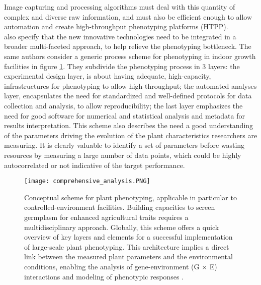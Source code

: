 Image capturing and processing algorithms must deal with this quantity of complex and diverse raw information, and must also be efficient enough to allow automation and create high-throughput phenotyping platforms (HTPP).\\
\textcite{fiorani_future_2013} also specify that the new innovative technologies need to be integrated in a broader multi-faceted approach, to help relieve the phenotyping bottleneck. The same authors consider a generic process scheme for phenotyping in indoor growth facilities in figure \ref{fig:comprehensive_analysis}. They subdivide the phenotyping process in 3 layers: the experimental design layer, is about having adequate, high-capacity, infrastructures for phenotyping to allow high-throughput; the automated analyses layer, encapsulates the need for standardized and well-defined protocols for data collection and analysis, to allow reproducibility; the last layer emphasizes the need for good software for numerical and statistical analysis and metadata for results interpretation. This scheme also describes the need a good understanding of the parameters driving the evolution of the plant characteristics researchers are measuring. It is clearly valuable to identify a set of parameters before wasting resources by measuring a large number of data points, which could be highly autocorrelated or not indicative of the target performance. 

\begin{figure}[hbtp]
    \centering
    \texttt{[image: comprehensive\_analysis.PNG]}
    \caption[Conceptual scheme for plant phenotyping]{Conceptual scheme for plant phenotyping, applicable in particular to controlled-environment facilities.
Building capacities to screen germplasm for enhanced agricultural traits requires a multidisciplinary
approach. Globally, this scheme offers a quick overview of key layers and elements for a successful implementation of large-scale plant phenotyping. 
This architecture implies a direct link between the measured plant parameters and the environmental conditions, enabling the analysis of gene-environment (G × E) interactions and modeling of phenotypic responses \parencite{fiorani_future_2013}.}
    \label{fig:comprehensive_analysis}
\end{figure}



